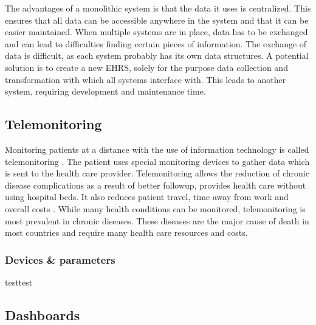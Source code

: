         The advantages of a monolithic system is that the data it uses is centralized. This ensures that all data can be accessible anywhere in the system and that it can be easier maintained. When multiple systems are in place, data has to be exchanged and can lead to difficulties finding certain pieces of information. The exchange of data is difficult, as each system probably has its own data structures. A potential solution is to create a new EHRS, solely for the purpose data collection and transformation with which all systems interface with. This leads to another system, requiring development and maintenance time.
    
    \subsection{Telemonitoring} \label{2_telemonitoring}
    Monitoring patients at a distance with the use of information technology is called telemonitoring \cite{systematic_review}. The patient uses special monitoring devices to gather data which is sent to the health care provider. Telemonitoring allows the reduction of chronic disease complications as a result of better followup, provides health care without using hospital beds. It also reduces patient travel, time away from work and overall costs \cite{telemonitoring_current_state}. While many health conditions can be monitored, telemonitoring is most prevalent in chronic diseases. These diseases are the major cause of death in most countries and require many health care resources and costs.

    
        \subsubsection{Devices \& parameters}

        testtest


    

    \subsection{Dashboards} \label{2_dashboards}



